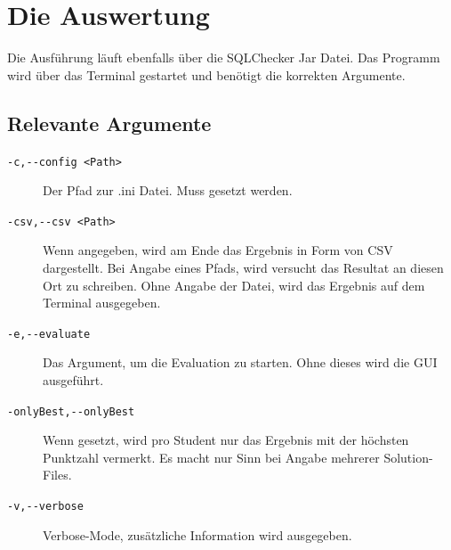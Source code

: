 \documentclass[11pt]{article}
\begin{document}
\section{Die Auswertung}
Die Ausführung läuft ebenfalls über die SQLChecker Jar Datei. Das Programm wird über das Terminal gestartet und benötigt die korrekten Argumente.

\subsection{Relevante Argumente}
\begin{description}
	\item[\texttt{-c,-{}-config <Path>}] Der Pfad zur .ini Datei. Muss gesetzt werden.
	\item[\texttt{-csv,-{}-csv <Path>}] Wenn angegeben, wird am Ende das Ergebnis in Form von CSV dargestellt. Bei Angabe eines Pfads, wird versucht das Resultat an diesen Ort zu schreiben. Ohne Angabe der Datei, wird das Ergebnis auf dem Terminal ausgegeben.
	\item[\texttt{-e,-{}-evaluate}] Das Argument, um die Evaluation zu starten. Ohne dieses wird die GUI ausgeführt.
	\item[\texttt{-onlyBest,-{}-onlyBest}] Wenn gesetzt, wird pro Student nur das Ergebnis mit der höchsten Punktzahl vermerkt. Es macht nur Sinn bei Angabe mehrerer Solution-Files. 
	\item[\texttt{-v,-{}-verbose}] Verbose-Mode, zusätzliche Information wird ausgegeben.
\end{description}
\end{document}
